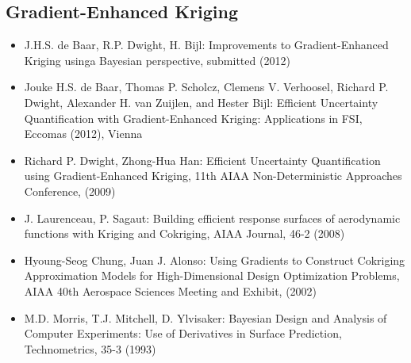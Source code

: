 \documentclass[a4paper,10pt]{article}
\begin{document}
\subsection{Gradient-Enhanced Kriging}
\begin{itemize}
\item J.H.S. de Baar, R.P. Dwight, H. Bijl: Improvements to Gradient-Enhanced Kriging usinga Bayesian perspective, submitted (2012)
\item Jouke H.S. de Baar, Thomas P. Scholcz, Clemens V. Verhoosel, Richard P. Dwight, Alexander H. van Zuijlen, and Hester Bijl: Efficient Uncertainty Quantification with Gradient-Enhanced Kriging: Applications in FSI, Eccomas (2012), Vienna
\item Richard P. Dwight, Zhong-Hua Han: Efficient Uncertainty Quantification using Gradient-Enhanced Kriging, 11th AIAA Non-Deterministic Approaches Conference, (2009)
\item J. Laurenceau, P. Sagaut: Building efficient response surfaces of aerodynamic functions with Kriging and Cokriging, AIAA Journal, 46-2 (2008)
\item Hyoung-Seog Chung, Juan J. Alonso: Using Gradients to Construct Cokriging Approximation Models for High-Dimensional Design Optimization Problems, AIAA 40th Aerospace Sciences Meeting and Exhibit, (2002)
\item M.D. Morris, T.J. Mitchell, D. Ylvisaker: Bayesian Design and Analysis of Computer Experiments: Use of Derivatives in Surface Prediction, Technometrics, 35-3 (1993)
\end{itemize}
\end{document}
